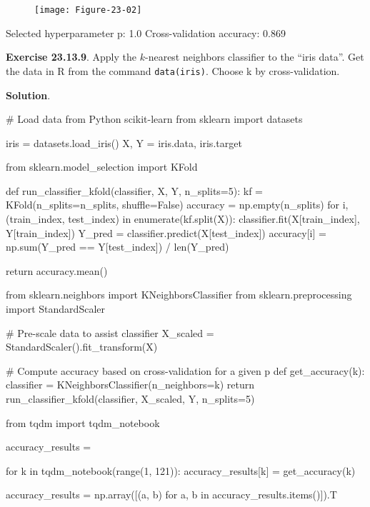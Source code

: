 \begin{figure}[H]
\centering
\texttt{[image: Figure-23-02]}
\end{figure}

\begin{console}
Selected hyperparameter p: 1.0
Cross-validation accuracy: 0.869
\end{console}

\textbf{Exercise 23.13.9}. Apply the \(k\)-nearest neighbors classifier
to the ``iris data''. Get the data in R from the command
\texttt{data(iris)}. Choose k by cross-validation.

\textbf{Solution}.

\begin{python}
# Load data from Python scikit-learn
from sklearn import datasets

iris = datasets.load_{i}ris()
X, Y = iris.data, iris.target
\end{python}

\begin{python}
from sklearn.model_selection import KFold

def run_classifier_{k}fold(classifier, X, Y, n_splits=5):
    kf = KFold(n_splits=n_splits, shuffle=False)
    accuracy = np.empty(n_splits)
    for i, (train_{i}ndex, test_{i}ndex) in enumerate(kf.split(X)):
        classifier.fit(X[train_{i}ndex], Y[train_{i}ndex])
        Y_pred = classifier.predict(X[test_{i}ndex])
        accuracy[i] = np.sum(Y_pred == Y[test_{i}ndex]) / len(Y_pred)
    
    return accuracy.mean()
\end{python}

\begin{python}
from sklearn.neighbors import KNeighborsClassifier
from sklearn.preprocessing import StandardScaler

# Pre-scale data to assist classifier
X_scaled = StandardScaler().fit_transform(X)

# Compute accuracy based on cross-validation for a given p
def get_accuracy(k):
    classifier = KNeighborsClassifier(n_{n}eighbors=k)
    return run_classifier_{k}fold(classifier, X_scaled, Y, n_splits=5)
\end{python}

\begin{python}
from tqdm import tqdm_{n}otebook

accuracy_results = {}

for k in tqdm_{n}otebook(range(1, 121)):
    accuracy_results[k] = get_accuracy(k)
    
accuracy_results = np.array([(a, b) for a, b in accuracy_results.items()]).T
\end{python}

